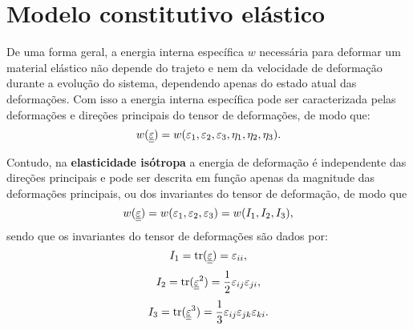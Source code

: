 \section{Modelo constitutivo elástico}

De uma forma geral, a energia interna específica $w$  necessária para deformar um material elástico não depende do trajeto e nem da velocidade de deformação durante a evolução do sistema, dependendo apenas do estado atual das deformações. Com isso a energia interna específica pode ser caracterizada pelas deformações e direções principais do tensor de deformações, de modo que:
\begin{equation}
	\label{eq:energia_interna_elastica}
	w(\underline{\underline \varepsilon}) = w(\varepsilon_1,\varepsilon_2,\varepsilon_3,\eta_1,\eta_2,\eta_3).
\end{equation}

Contudo, na \textbf{elasticidade isótropa} a energia de deformação é independente das direções principais e pode ser descrita em função apenas da magnitude das deformações principais, ou dos invariantes do tensor de deformação, de modo que
\begin{equation}
	\label{eq:energia_interna_elastica_isotropa}
	w(\underline{\underline \varepsilon}) = w(\varepsilon_1,\varepsilon_2,\varepsilon_3) = w(I_1,I_2,I_3),
\end{equation}
sendo que os invariantes do tensor de deformações são dados por:
\begin{equation}
	\label{eq:I1}
	I_1 = \text{tr}(\underline{\underline \varepsilon}) = \varepsilon_{ii},
\end{equation}
\begin{equation}
	\label{eq:I2}
	I_2 = \text{tr}(\underline{\underline \varepsilon}^2) = \frac{1}{2} \varepsilon_{ij} \varepsilon_{ji},
\end{equation}
\begin{equation}
	\label{eq:I3}
	I_3 = \text{tr}(\underline{\underline \varepsilon}^3) = \frac{1}{3} \varepsilon_{ij} \varepsilon_{jk} \varepsilon_{ki}.
\end{equation}

